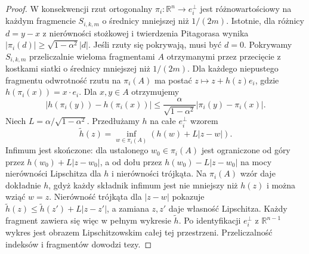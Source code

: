 \begin{proof}
W konsekwencji rzut ortogonalny
$\pi_i:\mathbb R^n\to e_i^\perp$ jest
różnowartościowy na każdym fragmencie
$S_{i,k,m}$ o średnicy mniejszej niż $1/(2m)$.
Istotnie, dla różnicy $d=y-x$ z nierówności
stożkowej i twierdzenia Pitagorasa wynika
$|\pi_i(d)|\ge\sqrt{1-\alpha^2}|d|$.
Jeśli rzuty się pokrywają, musi być $d=0$.
Pokrywamy $S_{i,k,m}$ przeliczalnie wieloma
fragmentami $A$ otrzymanymi przez przecięcie
z kostkami siatki o średnicy mniejszej niż
$1/(2m)$. Dla każdego niepustego fragmentu
odwrotność rzutu na $\pi_i(A)$ ma postać
$z\mapsto z+h(z)e_i$, gdzie $h(\pi_i(x))=x\cdot e_i$.
Dla $x,y\in A$ otrzymujemy
\[
 |h(\pi_i(y))-h(\pi_i(x))|
 \le\frac{\alpha}{\sqrt{1-\alpha^2}}|\pi_i(y)-\pi_i(x)|.
\]
Niech $L=\alpha/\sqrt{1-\alpha^2}$.
Przedłużamy $h$ na całe $e_i^\perp$ wzorem
\[
 \widetilde h(z)=\inf_{w\in\pi_i(A)}(h(w)+L|z-w|).
\]
Infimum jest skończone: dla ustalonego
$w_0\in\pi_i(A)$ jest ograniczone od góry
przez $h(w_0)+L|z-w_0|$, a od dołu przez
$h(w_0)-L|z-w_0|$ na mocy nierówności
Lipschitza dla $h$ i nierówności trójkąta.
Na $\pi_i(A)$ wzór daje dokładnie $h$,
gdyż każdy składnik infimum jest nie mniejszy
niż $h(z)$ i można wziąć $w=z$.
Nierówność trójkąta dla $|z-w|$ pokazuje
$\widetilde h(z)\le\widetilde h(z')+L|z-z'|$,
a zamiana $z,z'$ daje własność Lipschitza.
Każdy fragment zawiera się więc w pełnym wykresie
$\widetilde h$. Po identyfikacji $e_i^\perp$
z $\mathbb R^{n-1}$ wykres jest obrazem
Lipschitzowskim całej tej przestrzeni.
Przeliczalność indeksów i fragmentów dowodzi tezy.
\end{proof}

